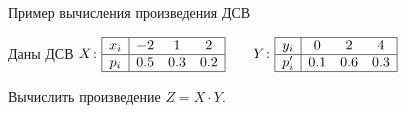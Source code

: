 \documentclass[unicode,11pt,notheorems,xcolor=table]{beamer}
\begin{document}
\begin{frame}{Пример вычисления произведения ДСВ}{}
    \begin{exampleblock}{}
        Даны ДСВ
        $X\colon \begin{array}{|c|ccc|}
        \hline
         x_i & -2 & 1& 2 \\
         \hline
         p_i & 0.5 & 0.3 & 0.2 \\
         \hline
        \end{array}
        \qquad
        Y\colon \begin{array}{|c|ccc|}
            \hline
             y_i & 0 & 2& 4 \\
             \hline
             p'_i & 0.1 & 0.6 & 0.3 \\
             \hline
            \end{array}
        $

        \smallskip
        Вычислить произведение $Z=X\cdot Y$.
    \end{exampleblock}
    

\end{frame}
\end{document}
